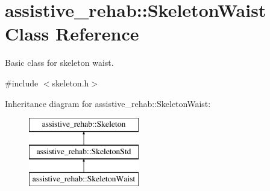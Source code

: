 \section{assistive\+\_\+rehab\+::Skeleton\+Waist Class Reference}
\label{classassistive__rehab_1_1SkeletonWaist}


Basic class for skeleton waist.  




{\ttfamily \#include $<$skeleton.\+h$>$}

Inheritance diagram for assistive\+\_\+rehab\+::Skeleton\+Waist\+:\begin{figure}[H]
\begin{center}
\leavevmode
\includegraphics[height=3.000000cm]{classassistive__rehab_1_1SkeletonWaist}
\end{center}
\end{figure}
